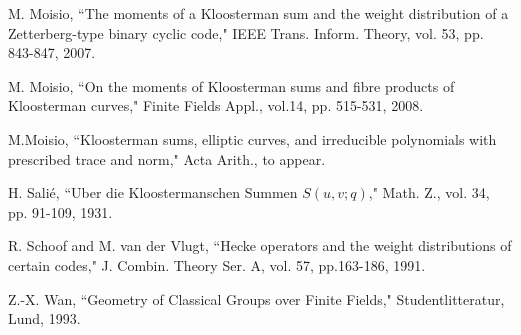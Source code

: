 \documentclass[a4,12pt]{elsart}
\begin{document}
\begin{thebibliography}{9}
M. Moisio, ``The moments of a Kloosterman sum and the weight
distribution of a Zetterberg-type binary cyclic code," IEEE Trans.
Inform. Theory, vol. 53, pp. 843-847, 2007.

M. Moisio, ``On the moments of Kloosterman sums and fibre products
of Kloosterman curves," Finite Fields Appl., vol.14, pp. 515-531,
2008.

M.Moisio, ``Kloosterman sums, elliptic curves, and irreducible
polynomials with prescribed trace and norm," Acta Arith., to appear.

H. Sali\'{e}, ``Uber die Kloostermanschen Summen $S(u,v;q)$," Math.
Z., vol. 34, pp. 91-109, 1931.

R. Schoof and M. van der Vlugt, ``Hecke operators and the weight
distributions of certain codes," J. Combin. Theory Ser. A, vol. 57,
pp.163-186, 1991.

Z.-X. Wan, ``Geometry of Classical Groups over Finite Fields,"
Studentlitteratur, Lund, 1993.

\end{thebibliography}
\end{document}
